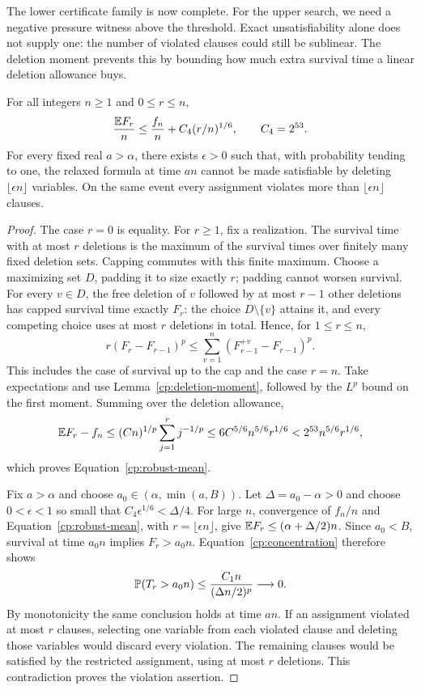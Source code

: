 The lower certificate family is now complete. For the upper search, we
need a negative pressure witness above the threshold. Exact
unsatisfiability alone does not supply one: the number of violated
clauses could still be sublinear. The deletion moment prevents this by
bounding how much extra survival time a linear deletion allowance buys.

\begin{proposition}
\label{cp:robust}
For all integers $n\ge1$ and $0\le r\le n$,
\begin{equation}\label{cp:robust-mean}
 \frac{\mathbb E F_r}{n}\le\frac{f_n}{n}
       +C_4(r/n)^{1/6},\qquad C_4=2^{53}.
\end{equation}
For every fixed real $a>\alpha$, there exists $\epsilon>0$ such that, with probability
tending to one, the relaxed formula at time $an$ cannot be made satisfiable
by deleting $\lfloor\epsilon n\rfloor$ variables. On the same event every
assignment violates more than $\lfloor\epsilon n\rfloor$ clauses.
\end{proposition}

\begin{proof}
The case $r=0$ is equality. For $r\ge1$, fix a realization.
The survival time with at most $r$ deletions is
the maximum of the survival times over finitely many fixed deletion sets.
Capping commutes with this finite maximum. Choose a maximizing set $D$,
padding it to size exactly $r$; padding cannot worsen survival. For every
$v\in D$, the free deletion of $v$ followed by at most $r-1$ other
deletions has capped survival time exactly $F_r$: the choice $D\setminus
\{v\}$ attains it, and every competing choice uses at most $r$ deletions
in total. Hence, for $1\le r\le n$,
\[
 r(F_r-F_{r-1})^p
 \le\sum_{v=1}^n(F_{r-1}^{+v}-F_{r-1})^p.
\]
This includes the case of survival up to the cap and the case $r=n$.
Take expectations and use Lemma~\ref{cp:deletion-moment}, followed by
the $L^p$ bound on the first moment. Summing over the deletion allowance,
\[
 \mathbb E F_r-f_n
 \le (Cn)^{1/p}\sum_{j=1}^r j^{-1/p}
 \le6C^{5/6}n^{5/6}r^{1/6}
 <2^{53}n^{5/6}r^{1/6},
\]
which proves Equation~\eqref{cp:robust-mean}.

Fix $a>\alpha$ and choose $a_0\in(\alpha,\min(a,B))$. Let
$\Delta=a_0-\alpha>0$ and choose $0<\epsilon<1$ so small that
$C_4\epsilon^{1/6}<\Delta/4$. For large $n$, convergence of $f_n/n$
and Equation~\eqref{cp:robust-mean}, with $r=\lfloor\epsilon n\rfloor$,
give $\mathbb E F_r\le(\alpha+\Delta/2)n$. Since $a_0<B$, survival at time
$a_0n$ implies $F_r>a_0n$. Equation~\eqref{cp:concentration} therefore
shows
\[
 \mathbb P(T_r>a_0n)
 \le\frac{C_1n}{(\Delta n/2)^p}\longrightarrow0.
\]
By monotonicity the same conclusion holds at time $an$. If an assignment
violated at most $r$ clauses, selecting one variable from each violated
clause and deleting those variables would discard every violation. The
remaining clauses would be satisfied by the restricted assignment, using
at most $r$ deletions. This contradiction proves the violation assertion.
\end{proof}

